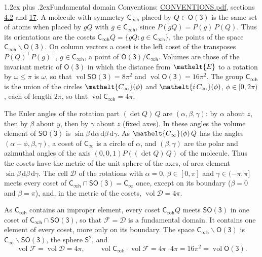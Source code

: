 \documentclass[10pt,a4paper]{article}
\makeatletter
\renewcommand\section{\@startsection{section}{1}{\z@}{-3ex plus -1ex minus -.2ex}%
  {1.2ex plus .2ex}{\normalfont\large\sffamily\bfseries\color{parttitle}}}
\numberwithin{equation}{section}
\newcommand{\eltfont}[1]{{\let\sigma\eltsigma\mathelt{#1}}}
\newcommand{\grp}[1]{\mathsf{#1}}
\newcommand{\elt}[1]{\eltfont{#1}}
\newcommand{\dirvec}[3]{(#1, #2, #3)}
\newcommand{\diff}{\mathrm{d}}
\newcommand{\vol}{\operatorname{vol}}
\newcommand{\fcell}{\mathcal{D}}
\newcommand{\fdomain}{\mathcal{F}}
\newcommand{\twosphere}{\mathsf{S}^{2}}
\makeatother
\begin{document}
\section{Fundamental domain}\label{s:fundamental_domain}
Conventions: \href{../../CONVENTIONS.pdf}{CONVENTIONS.pdf}, sections \href{../../CONVENTIONS.pdf\#conv.4.2}{4.2} and \href{../../CONVENTIONS.pdf\#conv.17}{17}.
\leavevmode\label{n:element.placement}A molecule with symmetry $\grp{C_{\infty h}}$ placed by $Q \in \grp{O(3)}$ is the same set of atoms when placed by $gQ$ with $g \in \grp{C_{\infty h}}$, since $P(gQ) = P(g)\,P(Q)$. \label{n:operator.cosets}Thus its orientations are the cosets $\grp{C_{\infty h}}Q = \{gQ : g \in \grp{C_{\infty h}}\}$, the points of the space $\grp{C_{\infty h}}\backslash\grp{O(3)}$. On column vectors a coset is the left coset of the transposes $P(Q)^{\top}P(g)^{\top}$, $g \in \grp{C_{\infty h}}$, a point of $\grp{O(3)}/\grp{C_{\infty h}}$.
\leavevmode\label{n:operator.volume}Volumes are those of the invariant metric of \href{O3.pdf}{$\grp{O(3)}$} in which the distance from $\elt{E}$ to a rotation by $\omega \le \pi$ is $\omega$, so that $\vol\grp{SO(3)} = 8\pi^2$ and $\vol\grp{O(3)} = 16\pi^2$. The group $\grp{C_{\infty h}}$ is the union of the circles $\elt{C_{\infty}}(\phi)$ and $\elt{i\,C_{\infty}}(\phi)$, $\phi \in [0, 2\pi)$, each of length $2\pi$, so that $\vol\grp{C_{\infty h}} = 4\pi$.

\leavevmode\label{n:angle.euler.alpha}\label{n:angle.euler.beta}\label{n:angle.euler.gamma}The Euler angles of the rotation part $(\det Q)\,Q$ are $(\alpha,\beta,\gamma)$: by $\alpha$ about $z$, then by $\beta$ about $y$, then by $\gamma$ about $z$ (fixed axes). In these angles the volume element of \href{SO3.pdf}{$\grp{SO(3)}$} is $\sin\beta\,\diff\alpha\,\diff\beta\,\diff\gamma$. As $\elt{C_{\infty}}(\phi)\,Q$ has the angles $(\alpha + \phi, \beta, \gamma)$, a coset of \href{Cinf.pdf}{$\grp{C_{\infty}}$} is a circle of $\alpha$, and $(\beta, \gamma)$ are the polar and azimuthal angles of the axis $\dirvec{0}{0}{1}P((\det Q)\,Q)$ of the molecule. Thus the cosets have the metric of the unit sphere of the axes, of area element $\sin\beta\,\diff\beta\,\diff\gamma$.
\leavevmode\label{n:set.cell}The cell $\fcell$ of the rotations with $\alpha = 0$, $\beta \in [0, \pi]$ and $\gamma \in (-\pi, \pi]$ meets every coset of $\grp{C_{\infty h}} \cap \grp{SO(3)} = \grp{C_{\infty}}$ once, except on its boundary ($\beta = 0$ and $\beta = \pi$), and, in the metric of the cosets, $\vol\fcell = 4\pi$.

\leavevmode\label{n:set.fundamental}As $\grp{C_{\infty h}}$ contains an improper element, every coset $\grp{C_{\infty h}}Q$ meets \href{SO3.pdf}{$\grp{SO(3)}$} in one coset of $\grp{C_{\infty h}} \cap \grp{SO(3)}$, so that $\fdomain = \fcell$ is a fundamental domain. It contains one element of every coset, more only on its boundary.
\leavevmode\label{n:set.sphere}The space $\grp{C_{\infty h}}\backslash\grp{O(3)}$ is $\grp{C_{\infty}}\backslash\grp{SO(3)}$, the sphere $\twosphere$, and
\begin{equation}\label{e:volume}\vol\fdomain = \vol\fcell = 4\pi,\qquad \vol\grp{C_{\infty h}}\cdot\vol\fdomain = 4\pi\cdot 4\pi = 16\pi^2 = \vol\grp{O(3)}.\end{equation}
\end{document}
